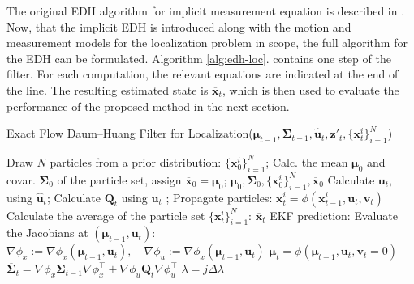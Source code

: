 The original EDH algorithm for implicit measurement equation is described
in \cite{Ding2012}.
Now, that the implicit EDH is introduced along with the motion and measurement models
for the localization problem in scope, the full algorithm for the EDH can be formulated.
Algorithm \ref{alg:edh-loc}. contains one step of the filter.
For each computation, the relevant equations are indicated at the end of the line.
The resulting estimated state is $\overline{\mathbf{x}}_t$, which is then used to evaluate the performance of the proposed method in the next section.
\begin{algorithm}
    \caption{Exact Flow Daum--Huang Filter for Localization($\boldsymbol{\mu}_{t-1},\mathbf{\Sigma}_{t-1},\hat{\mathbf{u}}_t,\mathbf{z}'_t,\{\mathbf{x}_t^i\}_{i=1}^{N}$)}\label{alg:edh-loc}
    \begin{algorithmic}[1]
         
        \State Draw $N$ particles from a prior distribution: $\{\mathbf{x}_0^i\}_{i=1}^{N}$;
        \State Calc. the mean $\boldsymbol\mu_0$ and covar. $\boldsymbol\Sigma_0$ of the particle set, assign $\overline{\mathbf{x}}_0 = \boldsymbol{\mathbf{\mu}}_0$;
        \State\Return $\boldsymbol{\mu}_0,\boldsymbol{\Sigma}_0,\{\mathbf{x}_0^i\}_{i=1}^{N},\overline{\mathbf{x}}_0$
        \EndIf
        \State Calculate $\mathbf{u}_t$, using $\hat{\mathbf{u}}_t$; \Comment{\eqref{eq:odom-raw-input}-\eqref{eq:odom-delta-input}}
        \State Calculate $\mathbf{Q}_t$ using $\mathbf{u}_t$ \Comment{\eqref{eq:control-covar}};
        \State Propagate particles: $\mathbf{x}_t^{i} = \phi(\mathbf{x}_{t-1}^{i},\mathbf{u}_t,\mathbf{v}_t)$
        \Comment{\eqref{eq:prop-x}-\eqref{eq:prop-theta}}
        \State Calculate the average of the particle set $\{\mathbf{x}_t^i\}_{i=1}^{N}$: $\overline{\mathbf{x}}_t$
        \State EKF prediction:
        \State\indent Evaluate the Jacobians at $(\boldsymbol{\mu}_{t-1},\mathbf{u}_t)$:
        \Comment{\eqref{eq:motmodel-jacobi-x}-\eqref{eq:motmodel-jacobi-u}}
        \State\indent\indent $\nabla\phi_x := \nabla\phi_x(\boldsymbol{\mu}_{t-1},\mathbf{u}_t),\quad \nabla\phi_u := \nabla\phi_x(\boldsymbol{\mu}_{t-1},\mathbf{u}_t)$
        \State\indent$\overline{\boldsymbol{\mu}}_t = \phi(\boldsymbol{\mu}_{t-1},\mathbf{u}_t,\mathbf{v}_t = 0)$
        \State\indent
        $\overline{\mathbf{\Sigma}}_t = \nabla \phi_x\mathbf{\Sigma}_{t-1}\nabla \phi_x^{\top}
            +\nabla \phi _u\mathbf{Q}_t \nabla \phi_u^{\top}$
         
        \State $\lambda = j\Delta\lambda$ 

\end{algorithmic}
\end{algorithm}
